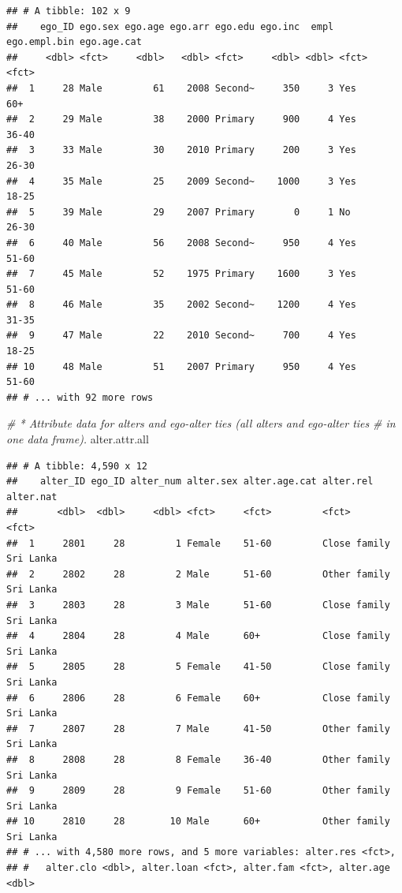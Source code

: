 \documentclass[
]{book}
\newenvironment{Shaded}{\begin{snugshade}}{\end{snugshade}}
\newcommand{\CommentTok}[1]{\textcolor[rgb]{0.56,0.35,0.01}{\textit{#1}}}
\newcommand{\NormalTok}[1]{#1}
\begin{document}
\begin{verbatim}
## # A tibble: 102 x 9
##    ego_ID ego.sex ego.age ego.arr ego.edu ego.inc  empl ego.empl.bin ego.age.cat
##     <dbl> <fct>     <dbl>   <dbl> <fct>     <dbl> <dbl> <fct>        <fct>      
##  1     28 Male         61    2008 Second~     350     3 Yes          60+        
##  2     29 Male         38    2000 Primary     900     4 Yes          36-40      
##  3     33 Male         30    2010 Primary     200     3 Yes          26-30      
##  4     35 Male         25    2009 Second~    1000     3 Yes          18-25      
##  5     39 Male         29    2007 Primary       0     1 No           26-30      
##  6     40 Male         56    2008 Second~     950     4 Yes          51-60      
##  7     45 Male         52    1975 Primary    1600     3 Yes          51-60      
##  8     46 Male         35    2002 Second~    1200     4 Yes          31-35      
##  9     47 Male         22    2010 Second~     700     4 Yes          18-25      
## 10     48 Male         51    2007 Primary     950     4 Yes          51-60      
## # ... with 92 more rows
\end{verbatim}

\begin{Shaded}
\begin{Highlighting}[]
\CommentTok{\# * Attribute data for alters and ego{-}alter ties (all alters and ego{-}alter ties }
\CommentTok{\# in one data frame). }
\NormalTok{alter.attr.all}
\end{Highlighting}
\end{Shaded}

\begin{verbatim}
## # A tibble: 4,590 x 12
##    alter_ID ego_ID alter_num alter.sex alter.age.cat alter.rel    alter.nat
##       <dbl>  <dbl>     <dbl> <fct>     <fct>         <fct>        <fct>    
##  1     2801     28         1 Female    51-60         Close family Sri Lanka
##  2     2802     28         2 Male      51-60         Other family Sri Lanka
##  3     2803     28         3 Male      51-60         Close family Sri Lanka
##  4     2804     28         4 Male      60+           Close family Sri Lanka
##  5     2805     28         5 Female    41-50         Close family Sri Lanka
##  6     2806     28         6 Female    60+           Close family Sri Lanka
##  7     2807     28         7 Male      41-50         Other family Sri Lanka
##  8     2808     28         8 Female    36-40         Other family Sri Lanka
##  9     2809     28         9 Female    51-60         Other family Sri Lanka
## 10     2810     28        10 Male      60+           Other family Sri Lanka
## # ... with 4,580 more rows, and 5 more variables: alter.res <fct>,
## #   alter.clo <dbl>, alter.loan <fct>, alter.fam <fct>, alter.age <dbl>
\end{verbatim}
\end{document}
